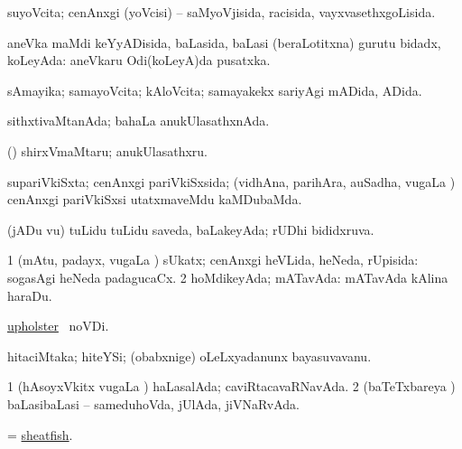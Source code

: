 \bentry
{} 
\gl{\gu}
\expl{}
\bmng
suyoVcita; cenAnxgi (yoVcisi) -- saMyoVjisida, racisida, vayxvasethxgoLisida. 
\emng
\eentry

\bentry
{} 
\gl{\gu}
\expl{}
\bmng
aneVka maMdi keYyADisida, baLasida, baLasi (beraLotitxna) gurutu bidadx, koLeyAda:  aneVkaru Odi(koLeyA)da pusatxka. 
\emng
\eentry

\bentry
{} 
\gl{\gu}
\expl{}
\bmng
sAmayika; samayoVcita; kAloVcita; samayakekx sariyAgi mADida, ADida. 
\emng
\eentry

\bentry
{} 
\gl{\gu}
\expl{}
\bmng
sithxtivaMtanAda; bahaLa anukUlasathxnAda. 
\emng
\eentry

\bentry
{} 
\gl{\nA}
\expl{}
\bmng
(\bava) shirxVmaMtaru; anukUlasathxru. 
\emng
\eentry

\bentry
{} 
\gl{\gu}
\expl{}
\bmng
supariVkiSxta; cenAnxgi pariVkiSxsida; (vidhAna, parihAra, auSadha, \mo vugaLa \vi) cenAnxgi pariVkiSxsi utatxmaveMdu kaMDubaMda. 
\emng
\eentry

\bentry
{} 
\gl{\gu}
\expl{}
\bmng
(jADu \mo vu) tuLidu tuLidu saveda, baLakeyAda; rUDhi bididxruva. 
\emng
\eentry

\bentry
{} 
\gl{\gu}
\expl{}
\bmng
\bnum
\num{1} (mAtu, padayx, \mo vugaLa \vi) sUkatx; cenAnxgi heVLida, heNeda, rUpisida:  sogasAgi heNeda padagucaCx. 
\num{2} hoMdikeyAda; mATavAda:  mATavAda kAlina haraDu. 
\enum
\emng
\eentry

\bentry
{} 
\gl{\gu}
\expl{}
\bmng
\hyperref{kandict_u.pdf}{U}{upholsterpagu}{upholster} \pagu\ noVDi. 
\emng
\eentry

\bentry
{} 
\gl{\nA}
\expl{}
\bmng
hitaciMtaka; hiteYSi; (obabxnige) oLeLxyadanunx bayasuvavanu. 
\emng
\eentry

\bentry
{} 
\gl{\gu}
\expl{}
\bmng
\bnum
\num{1} (hAsoyxVkitx \mo vugaLa \vi) haLasalAda; caviRtacavaRNavAda. 
\num{2} (baTeTxbareya \vi) baLasibaLasi -- sameduhoVda, jUlAda, jiVNaRvAda. 
\enum
\emng
\eentry

\bentry
{} 
\gl{\nA}
\expl{}
\bmng
= \hyperref{kandict_s.pdf}{S}{sheatfish}{sheatfish}. 
\emng
\eentry

